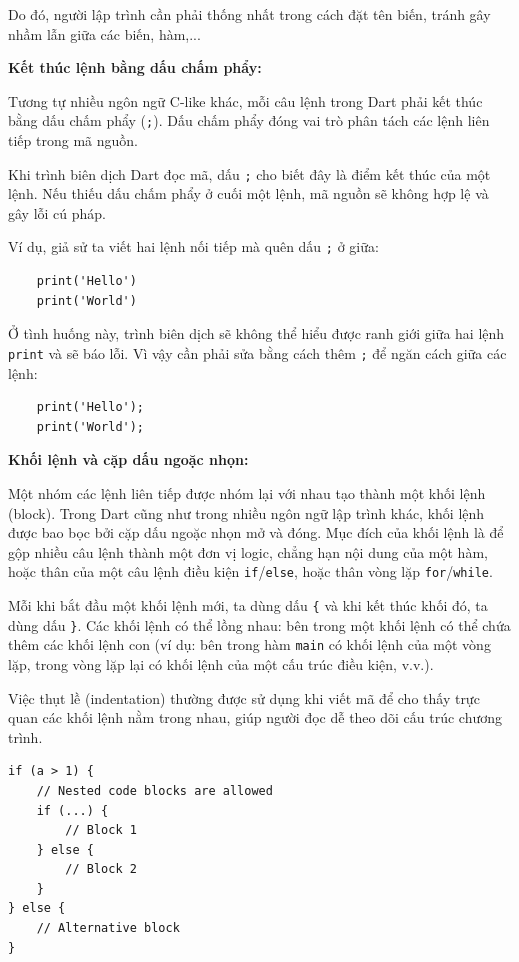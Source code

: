 \documentclass[../DoAn.tex]{subfiles}
\numberwithin{figure}{chapter}
\begin{document}
Do đó, người lập trình cần phải thống nhất trong cách đặt tên biến, tránh gây nhầm lẫn giữa các biến, hàm,... 

\textbf{Kết thúc lệnh bằng dấu chấm phẩy:} 

Tương tự nhiều ngôn ngữ C-like khác, mỗi câu lệnh trong Dart phải kết thúc bằng dấu chấm phẩy (\texttt{;}). Dấu chấm phẩy đóng vai trò phân tách các lệnh liên tiếp trong mã nguồn.  

Khi trình biên dịch Dart đọc mã, dấu \texttt{;} cho biết đây là điểm kết thúc của một lệnh. Nếu thiếu dấu chấm phẩy ở cuối một lệnh, mã nguồn sẽ không hợp lệ và gây lỗi cú pháp. 

Ví dụ, giả sử ta viết hai lệnh nối tiếp mà quên dấu \texttt{;} ở giữa:
\begin{lstlisting}
    print('Hello')
    print('World')
\end{lstlisting}

Ở tình huống này, trình biên dịch sẽ không thể hiểu được ranh giới giữa hai lệnh \texttt{print} và sẽ báo lỗi. Vì vậy cần phải sửa bằng cách thêm \texttt{;} để ngăn cách giữa các lệnh: 
\begin{lstlisting}
    print('Hello');
    print('World');
\end{lstlisting}

\textbf{Khối lệnh và cặp dấu ngoặc nhọn:} 

Một nhóm các lệnh liên tiếp được nhóm lại với nhau tạo thành một khối lệnh (block). Trong Dart cũng như trong nhiều ngôn ngữ lập trình khác, khối lệnh được bao bọc bởi cặp dấu ngoặc nhọn mở và đóng. Mục đích của khối lệnh là để gộp nhiều câu lệnh thành một đơn vị logic, chẳng hạn nội dung của một hàm, hoặc thân của một câu lệnh điều kiện \texttt{if}/\texttt{else}, hoặc thân vòng lặp \texttt{for}/\texttt{while}. 

Mỗi khi bắt đầu một khối lệnh mới, ta dùng dấu \texttt{\{} và khi kết thúc khối đó, ta dùng dấu \texttt{\}}. Các khối lệnh có thể lồng nhau: bên trong một khối lệnh có thể chứa thêm các khối lệnh con (ví dụ: bên trong hàm \texttt{main} có khối lệnh của một vòng lặp, trong vòng lặp lại có khối lệnh của một cấu trúc điều kiện, v.v.). 

Việc thụt lề (indentation) thường được sử dụng khi viết mã để cho thấy trực quan các khối lệnh nằm trong nhau, giúp người đọc dễ theo dõi cấu trúc chương trình.

\begin{lstlisting}
if (a > 1) {
    // Nested code blocks are allowed
    if (...) {
        // Block 1
    } else {
        // Block 2
    }
} else {
    // Alternative block
}
\end{lstlisting}
\end{document}
